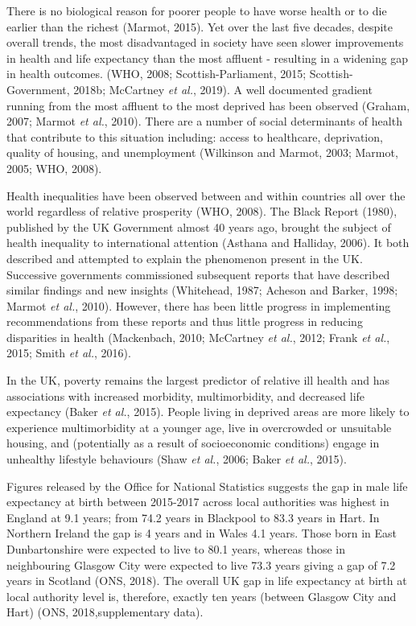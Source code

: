 \documentclass[12pt,a4paper,oneside,table]{report}
\begin{document}
There is no biological reason for poorer people to have worse health or
to die earlier than the richest (Marmot, 2015). Yet over the last five
decades, despite overall trends, the most disadvantaged in society have
seen slower improvements in health and life expectancy than the most
affluent - resulting in a widening gap in health outcomes. (WHO, 2008;
Scottish-Parliament, 2015; Scottish-Government, 2018b; McCartney
\emph{et al.}, 2019). A well documented gradient running from the most
affluent to the most deprived has been observed (Graham, 2007; Marmot
\emph{et al.}, 2010). There are a number of social determinants of
health that contribute to this situation including: access to
healthcare, deprivation, quality of housing, and unemployment (Wilkinson
and Marmot, 2003; Marmot, 2005; WHO, 2008).

Health inequalities have been observed between and within countries all
over the world regardless of relative prosperity (WHO, 2008). The Black
Report (1980), published by the UK Government almost 40 years ago,
brought the subject of health inequality to international attention
(Asthana and Halliday, 2006). It both described and attempted to explain
the phenomenon present in the UK. Successive governments commissioned
subsequent reports that have described similar findings and new insights
(Whitehead, 1987; Acheson and Barker, 1998; Marmot \emph{et al.}, 2010).
However, there has been little progress in implementing recommendations
from these reports and thus little progress in reducing disparities in
health (Mackenbach, 2010; McCartney \emph{et al.}, 2012; Frank \emph{et
al.}, 2015; Smith \emph{et al.}, 2016).

In the UK, poverty remains the largest predictor of relative ill health
and has associations with increased morbidity, multimorbidity, and
decreased life expectancy (Baker \emph{et al.}, 2015). People living in
deprived areas are more likely to experience multimorbidity at a younger
age, live in overcrowded or unsuitable housing, and (potentially as a
result of socioeconomic conditions) engage in unhealthy lifestyle
behaviours (Shaw \emph{et al.}, 2006; Baker \emph{et al.}, 2015).

Figures released by the Office for National Statistics suggests the gap
in male life expectancy at birth between 2015-2017 across local
authorities was highest in England at 9.1 years; from 74.2 years in
Blackpool to 83.3 years in Hart. In Northern Ireland the gap is 4 years
and in Wales 4.1 years. Those born in East Dunbartonshire were expected
to live to 80.1 years, whereas those in neighbouring Glasgow City were
expected to live 73.3 years giving a gap of 7.2 years in Scotland (ONS,
2018). The overall UK gap in life expectancy at birth at local authority
level is, therefore, exactly ten years (between Glasgow City and Hart)
(ONS, 2018,supplementary data).
\end{document}
